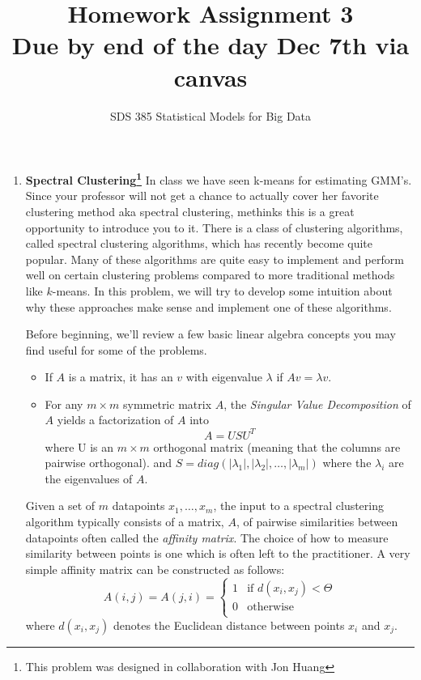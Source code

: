 \documentclass[11pt]{article}
\begin{document}
\title{{\bf Homework Assignment 3\\
Due by end of the day Dec 7th via canvas}}
\author{SDS 385 Statistical Models for Big Data}

\date{}

\maketitle{}
\begin{enumerate}
\item \textbf{Spectral Clustering\footnote{This problem was designed in collaboration with Jon Huang}}
In class we have seen k-means for estimating GMM's. Since your professor will not get a chance to actually cover her favorite clustering method aka spectral clustering, methinks this is a great opportunity to introduce you to it.
There is a class of clustering algorithms, called 
spectral clustering algorithms, which has recently 
become quite popular.  Many of these algorithms are 
quite easy to implement and perform well on 
certain clustering problems compared to more traditional 
methods like $k$-means.  In this problem, we will try to 
develop some intuition about why these approaches
make sense and implement one of these algorithms.

Before beginning, we'll review a few basic linear
algebra concepts you may find useful for some
of the problems.
\begin{itemize}
\item If $A$ is a matrix, it has an 
$v$ with eigenvalue $\lambda$ if $Av=\lambda v$.
\item For any $m\times m$ symmetric matrix $A$, 
the \emph{Singular Value Decomposition} of $A$ yields a 
factorization of $A$ into
\[
A = USU^T
\]
where U is an $m\times m$ orthogonal matrix 
(meaning that the columns are pairwise orthogonal).
and $S=diag(|\lambda_1|,|\lambda_2|,\dots,|\lambda_m|)$ 
where the $\lambda_i$ are the eigenvalues of $A$. 
\end{itemize}

Given a set of $m$ datapoints $x_1,\dots,x_m$,
the input to a spectral clustering algorithm typically
consists of a matrix, $A$, of pairwise similarities between
datapoints often called the \emph{affinity matrix}.  The choice of
how to measure similarity between points is one which is often left 
to the practitioner.  A very simple affinity matrix can be
constructed as follows:
\begin{equation}
\label{aff-eqn}
A(i,j)=A(j,i)=\left\{ \begin{array}{cc} 1 & \mbox{if $d(x_i,x_j)<\Theta$} \\
0 & \mbox{otherwise} \\
\end{array}\right.
\end{equation}
where $d(x_i,x_j)$ denotes the Euclidean distance 
between points $x_i$ and $x_j$.


\end{enumerate}
\end{document}
